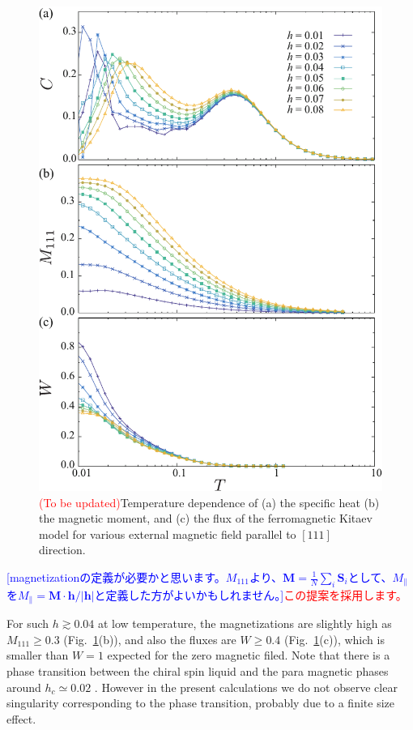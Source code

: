 \documentclass[reprint,amsmath,amssymb,aps,prx]{revtex4-2}
\newcommand{\red}[1]{\textcolor{red}{#1}}
\newcommand{\blue}[1]{\textcolor{blue}{#1}}
\begin{document}
\begin{figure}
  \begin{center}
    \includegraphics[width=0.9\linewidth]{Figs/plot_CMF.pdf}
  \end{center}
  \caption{\textcolor{red}{(To be updated)}Temperature dependence of (a) the specific heat (b) the magnetic moment, and (c) the flux of the ferromagnetic Kitaev model for various external magnetic field parallel to $[111]$ direction.}
  \label{fig:CMF_pure}
\end{figure}

\blue{[magnetizationの定義が必要かと思います。$M_{111}$より、$\bm{M}=\frac{1}{N}\sum_i \bm{S}_i$として、$M_\parallel$を$M_\parallel=\bm{M}\cdot\bm{h}/|\bm{h}|$と定義した方がよいかもしれません。]}\red{この提案を採用します。}

For such $h \gtrsim 0.04$ at low temperature, the magnetizations are slightly high as $M_{111} \ge 0.3$ (Fig.~\ref{fig:CMF_pure}(b)), and also the fluxes are $W \ge 0.4$ (Fig.~\ref{fig:CMF_pure}(c)), which is smaller than $W=1$ expected for the zero magnetic filed. Note that there is a phase transition between the chiral spin liquid and the para magnetic phases around $h_c \simeq 0.02$ \cite{ZhuKSF2018,LeeKCOYKK2020}. However in the present calculations we do not observe clear singularity corresponding to the phase transition, probably due to a finite size effect. 
\end{document}
